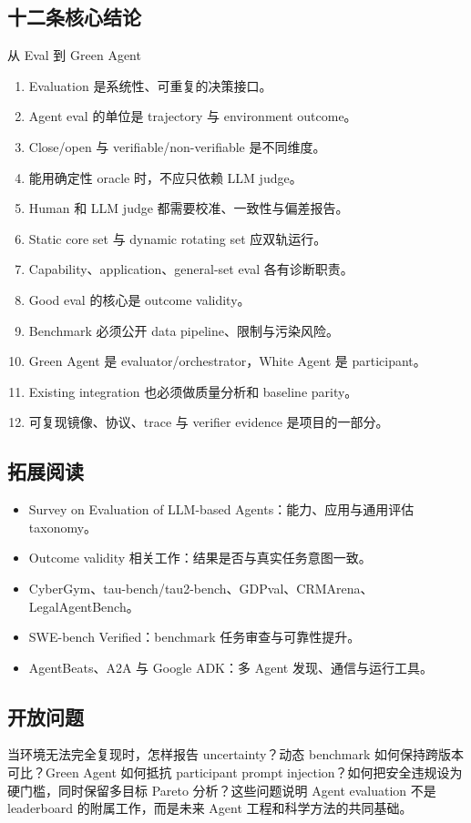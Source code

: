 \documentclass[a4paper]{article}
\begin{document}
\subsection{十二条核心结论}

\begin{importantbox}{从 Eval 到 Green Agent}
\begin{enumerate}[leftmargin=*]
\item Evaluation 是系统性、可重复的决策接口。
\item Agent eval 的单位是 trajectory 与 environment outcome。
\item Close/open 与 verifiable/non-verifiable 是不同维度。
\item 能用确定性 oracle 时，不应只依赖 LLM judge。
\item Human 和 LLM judge 都需要校准、一致性与偏差报告。
\item Static core set 与 dynamic rotating set 应双轨运行。
\item Capability、application、general-set eval 各有诊断职责。
\item Good eval 的核心是 outcome validity。
\item Benchmark 必须公开 data pipeline、限制与污染风险。
\item Green Agent 是 evaluator/orchestrator，White Agent 是 participant。
\item Existing integration 也必须做质量分析和 baseline parity。
\item 可复现镜像、协议、trace 与 verifier evidence 是项目的一部分。
\end{enumerate}
\end{importantbox}

\subsection{拓展阅读}

\begin{itemize}
\item Survey on Evaluation of LLM-based Agents：能力、应用与通用评估 taxonomy。
\item Outcome validity 相关工作：结果是否与真实任务意图一致。
\item CyberGym、tau-bench/tau2-bench、GDPval、CRMArena、LegalAgentBench。
\item SWE-bench Verified：benchmark 任务审查与可靠性提升。
\item AgentBeats、A2A 与 Google ADK：多 Agent 发现、通信与运行工具。
\end{itemize}

\subsection{开放问题}

当环境无法完全复现时，怎样报告 uncertainty？动态 benchmark 如何保持跨版本可比？Green Agent 如何抵抗 participant prompt injection？如何把安全违规设为硬门槛，同时保留多目标 Pareto 分析？这些问题说明 Agent evaluation 不是 leaderboard 的附属工作，而是未来 Agent 工程和科学方法的共同基础。
\end{document}
